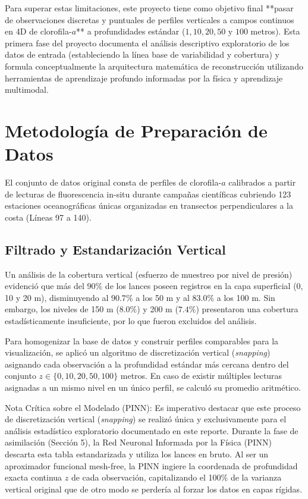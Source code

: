 \documentclass[11pt,a4paper]{article}
\begin{document}
Para superar estas limitaciones, este proyecto tiene como objetivo final **pasar de observaciones discretas y puntuales de perfiles verticales a campos continuos en 4D de clorofila-$a$** a profundidades estándar ($1, 10, 20, 50 \text{ y } 100$ metros). Esta primera fase del proyecto documenta el análisis descriptivo exploratorio de los datos de entrada (estableciendo la línea base de variabilidad y cobertura) y formula conceptualmente la arquitectura matemática de reconstrucción utilizando herramientas de aprendizaje profundo informadas por la física y aprendizaje multimodal.

\section{Metodología de Preparación de Datos}
El conjunto de datos original consta de perfiles de clorofila-$a$ calibrados a partir de lecturas de fluorescencia in-situ durante campañas científicas cubriendo 123 estaciones oceanográficas únicas organizadas en transectos perpendiculares a la costa (Líneas 97 a 140).

\subsection{Filtrado y Estandarización Vertical}
Un análisis de la cobertura vertical (esfuerzo de muestreo por nivel de presión) evidenció que más del $90\%$ de los lances poseen registros en la capa superficial (0, 10 y 20 m), disminuyendo al $90.7\%$ a los 50 m y al $83.0\%$ a los 100 m. Sin embargo, los niveles de 150 m ($8.0\%$) y 200 m ($7.4\%$) presentaron una cobertura estadísticamente insuficiente, por lo que fueron excluidos del análisis. 

Para homogenizar la base de datos y construir perfiles comparables para la visualización, se aplicó un algoritmo de discretización vertical (\textit{snapping}) asignando cada observación a la profundidad estándar más cercana dentro del conjunto $z \in \{0, 10, 20, 50, 100\}$ metros. En caso de existir múltiples lecturas asignadas a un mismo nivel en un único perfil, se calculó su promedio aritmético.

Nota Crítica sobre el Modelado (PINN): Es imperativo destacar que este proceso de discretización vertical (\textit{snapping}) se realizó única y exclusivamente para el análisis estadístico exploratorio documentado en este reporte. Durante la fase de asimilación (Sección 5), la Red Neuronal Informada por la Física (PINN) descarta esta tabla estandarizada y utiliza los lances en bruto. Al ser un aproximador funcional mesh-free, la PINN ingiere la coordenada de profundidad exacta continua $z$ de cada observación, capitalizando el 100\% de la varianza vertical original que de otro modo se perdería al forzar los datos en capas rígidas.
\end{document}

